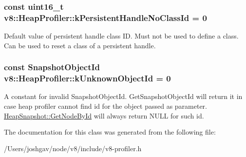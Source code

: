 \subsubsection[{\texorpdfstring{k\+Persistent\+Handle\+No\+Class\+Id}{kPersistentHandleNoClassId}}]{\setlength{\rightskip}{0pt plus 5cm}const uint16\+\_\+t v8\+::\+Heap\+Profiler\+::k\+Persistent\+Handle\+No\+Class\+Id = 0\hspace{0.3cm}{\ttfamily [static]}}\hypertarget{classv8_1_1_heap_profiler_a272c9af3ea5cd90a2737af3d22a7eb78}{}\label{classv8_1_1_heap_profiler_a272c9af3ea5cd90a2737af3d22a7eb78}
Default value of persistent handle class ID. Must not be used to define a class. Can be used to reset a class of a persistent handle. 
\subsubsection[{\texorpdfstring{k\+Unknown\+Object\+Id}{kUnknownObjectId}}]{\setlength{\rightskip}{0pt plus 5cm}const Snapshot\+Object\+Id v8\+::\+Heap\+Profiler\+::k\+Unknown\+Object\+Id = 0\hspace{0.3cm}{\ttfamily [static]}}\hypertarget{classv8_1_1_heap_profiler_abf2b9d8facb18473f9b124ab8baf5786}{}\label{classv8_1_1_heap_profiler_abf2b9d8facb18473f9b124ab8baf5786}
A constant for invalid Snapshot\+Object\+Id. Get\+Snapshot\+Object\+Id will return it in case heap profiler cannot find id for the object passed as parameter. \hyperlink{classv8_1_1_heap_snapshot_a023696f94fe538380922bf2c40c97b7b}{Heap\+Snapshot\+::\+Get\+Node\+By\+Id} will always return N\+U\+LL for such id. 

The documentation for this class was generated from the following file\+:\begin{DoxyCompactItemize}
\item 
/\+Users/joshgav/node/v8/include/v8-\/profiler.\+h\end{DoxyCompactItemize}
